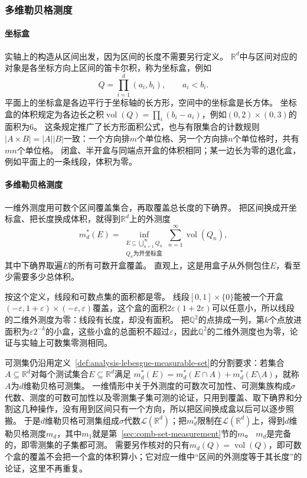 \subsubsection{多维勒贝格测度}

\paragraph{坐标盒}

实轴上的构造从区间出发，因为区间的长度不需要另行定义。
$\mathbb R^d$中与区间对应的对象是各坐标方向上区间的笛卡尔积，称为坐标盒，例如
\[
 Q=\prod_{i=1}^d(a_i,b_i),\qquad a_i<b_i.
\]
平面上的坐标盒是各边平行于坐标轴的长方形，空间中的坐标盒是长方体。
坐标盒的体积规定为各边长之积$\operatorname{vol}(Q)=\prod_i(b_i-a_i)$，例如$(0,2)\times(0,3)$的面积为$6$。
这条规定推广了长方形面积公式，也与有限集合的计数规则$|A\times B|=|A||B|$一致：一个方向排$m$个单位格、另一个方向排$n$个单位格时，共有$mn$个单位格。
闭盒、半开盒与同端点开盒的体积相同；某一边长为零的退化盒，例如平面上的一条线段，体积为零。

\paragraph{多维勒贝格测度}

一维外测度用可数个区间覆盖集合，再取覆盖总长度的下确界。
把区间换成开坐标盒、把长度换成体积，就得到$\mathbb R^d$上的外测度
\[
 m_d^*(E)=\inf_{\substack{E\subseteq\bigcup_{n=1}^{\infty}Q_n\\
 Q_n\text{为开坐标盒}}}\sum_{n=1}^{\infty}\operatorname{vol}(Q_n),
\]
其中下确界取遍$E$的所有可数开盒覆盖。
直观上，这是用盒子从外侧包住$E$，看至少需要多少总体积。

按这个定义，线段和可数点集的面积都是零。
线段$[0,1]\times\{0\}$能被一个开盒$(-\varepsilon,1+\varepsilon)\times(-\varepsilon,\varepsilon)$覆盖，这个盒的面积$2\varepsilon(1+2\varepsilon)$可以任意小，所以线段的二维外测度为零：线段有长度，却没有面积。
把$\mathbb Q^2$的点排成一列，第$k$个点放进面积为$\varepsilon2^{-k}$的小盒，这些小盒的总面积不超过$\varepsilon$，因此$\mathbb Q^2$的二维外测度也为零，论证与实轴上可数集零测相同。

可测集仍沿用定义~\ref{def:analysis-lebesgue-measurable-set}的分割要求：若集合$A\subseteq\mathbb R^d$对每个测试集合$E\subseteq\mathbb R^d$满足
$m_d^*(E)=m_d^*(E\cap A)+m_d^*(E\setminus A)$，就称$A$为$d$维勒贝格可测集。
一维情形中关于外测度的可数次可加性、可测集族构成$\sigma$代数、测度的可数可加性以及零测集子集可测的论证，只用到覆盖、取下确界和分割这几种操作，没有用到区间只有一个方向，所以把区间换成盒以后可以逐步照搬。
于是$d$维勒贝格可测集组成$\sigma$代数$\mathcal L(\mathbb R^d)$；把$m_d^*$限制在$\mathcal L(\mathbb R^d)$上，得到$d$维勒贝格测度$m_d$，其中$m_1$就是第~\ref{sec:comb-set-measurement}节的$m$。
$m_d$是完备的，即零测集的子集都可测。
需要另作核对的只有$m_d(Q)=\operatorname{vol}(Q)$，即可数个盒的覆盖不会把一个盒的体积算小；它对应一维中“区间的外测度等于其长度”的论证，这里不再重复。

